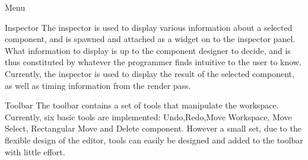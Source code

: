 Menu

Inspector
The inspector is used to display various information about a selected component, and is spawned and attached as a widget on to the inspector panel. What information to display is up to the component designer to decide, and is thus constituted by whatever the programmer finds intuitive to the user to know. Currently, the inspector is used to display the result of the selected component, as well as timing information from the render pass.

Toolbar
The toolbar contains a set of tools that manipulate the workspace. Currently, six basic tools are implemented: Undo,Redo,Move Workspace, Move Select, Rectangular Move and Delete component. However a small set, due to the flexible design of the editor, tools can easily be designed and added to the toolbar with little effort. 
 